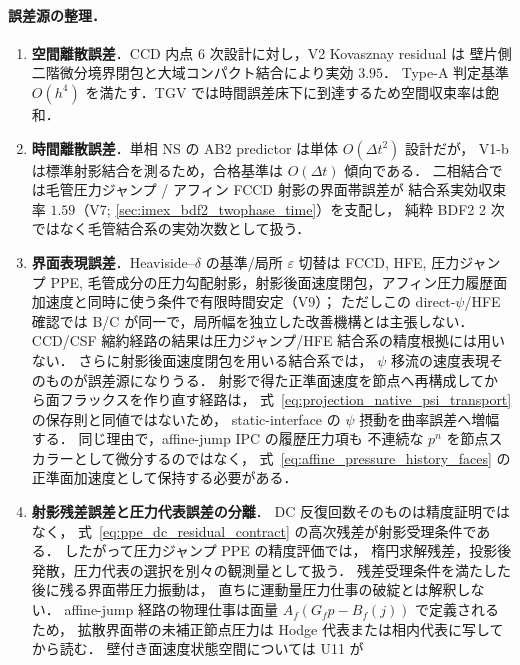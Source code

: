 \paragraph{誤差源の整理．}
\begin{enumerate}\setlength{\itemsep}{0pt}
  \item \textbf{空間離散誤差}．CCD 内点 6 次設計に対し，V2 Kovasznay residual は
        壁片側二階微分境界閉包と大域コンパクト結合により実効 $3.95$．
        Type-A 判定基準 $O(h^4)$ を満たす．TGV では時間誤差床下に到達するため空間収束率は飽和．
  \item \textbf{時間離散誤差}．単相 NS の AB2 predictor は単体 $O(\Delta t^2)$ 設計だが，
        V1-b は標準射影結合を測るため，合格基準は $O(\Delta t)$ 傾向である．
        二相結合では毛管圧力ジャンプ / アフィン FCCD 射影の界面帯誤差が
        結合系実効収束率 $1.59$（V7; \autoref{sec:imex_bdf2_twophase_time}）を支配し，
        純粋 BDF2 2 次ではなく毛管結合系の実効次数として扱う．
  \item \textbf{界面表現誤差}．Heaviside--$\delta$ の基準/局所 $\varepsilon$ 切替は
        FCCD, HFE, 圧力ジャンプ PPE, 毛管成分の圧力勾配射影，射影後面速度閉包，アフィン圧力履歴面加速度と同時に使う条件で有限時間安定（V9）；
        ただしこの direct-$\psi$/HFE 確認では B/C が同一で，局所幅を独立した改善機構とは主張しない．
        CCD/CSF 縮約経路の結果は圧力ジャンプ/HFE 結合系の精度根拠には用いない．
        さらに射影後面速度閉包を用いる結合系では，
        $\psi$ 移流の速度表現そのものが誤差源になりうる．
        射影で得た正準面速度を節点へ再構成してから面フラックスを作り直す経路は，
        式~\eqref{eq:projection_native_psi_transport} の保存則と同値ではないため，
        static-interface の $\psi$ 摂動を曲率誤差へ増幅する．
        同じ理由で，affine-jump IPC の履歴圧力項も
        不連続な $p^n$ を節点スカラーとして微分するのではなく，
        式~\eqref{eq:affine_pressure_history_faces} の正準面加速度として保持する必要がある．
  \item \textbf{射影残差誤差と圧力代表誤差の分離}．
        DC 反復回数そのものは精度証明ではなく，
        式~\eqref{eq:ppe_dc_residual_contract} の高次残差が射影受理条件である．
        したがって圧力ジャンプ PPE の精度評価では，
        楕円求解残差，投影後発散，圧力代表の選択を別々の観測量として扱う．
        残差受理条件を満たした後に残る界面帯圧力振動は，
        直ちに運動量圧力仕事の破綻とは解釈しない．
        affine-jump 経路の物理仕事は面量
        $A_f(G_fp-B_f(j))$ で定義されるため，
        拡散界面帯の未補正節点圧力は Hodge 代表または相内代表に写してから読む．
        壁付き面速度状態空間については U11 が

\end{enumerate}
